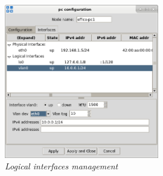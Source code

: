 \begin{figure}[H]
\centering
\vspace{10pt}
\includegraphics[width=0.6\textwidth]{./images/vlan_logical_interfaces.png}
\caption{\emph{Logical interfaces management}}
\label{fig:vlan_logical_ifcs}
\end{figure}

%

